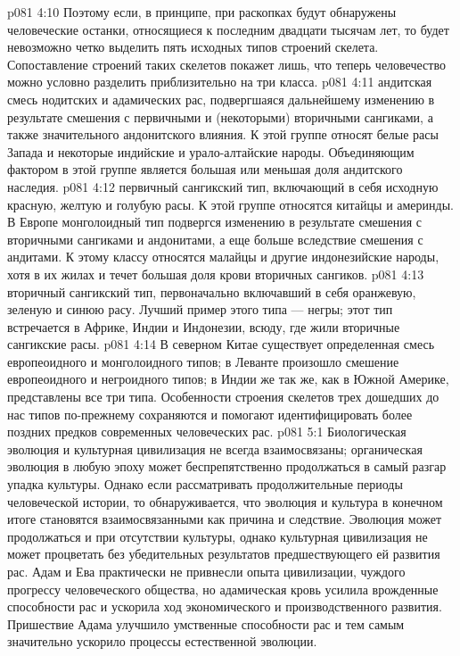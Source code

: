 \vs p081 4:10 Поэтому если, в принципе, при раскопках будут обнаружены человеческие останки, относящиеся к последним двадцати тысячам лет, то будет невозможно четко выделить пять исходных типов строений скелета. Сопоставление строений таких скелетов покажет лишь, что теперь человечество можно условно разделить приблизительно на три класса.
\vs p081 4:11 \bibnobreakspace {} андитская смесь нодитских и адамических рас, подвергшаяся дальнейшему изменению в результате смешения с первичными и (некоторыми) вторичными сангиками, а также значительного андонитского влияния. К этой группе относят белые расы Запада и некоторые индийские и урало\hyp{}алтайские народы. Объединяющим фактором в этой группе является большая или меньшая доля андитского наследия.
\vs p081 4:12 \bibnobreakspace {} первичный сангикский тип, включающий в себя исходную красную, желтую и голубую расы. К этой группе относятся китайцы и америнды. В Европе монголоидный тип подвергся изменению в результате смешения с вторичными сангиками и андонитами, а еще больше вследствие смешения с андитами. К этому классу относятся малайцы и другие индонезийские народы, хотя в их жилах и течет большая доля крови вторичных сангиков.
\vs p081 4:13 \bibnobreakspace {} вторичный сангикский тип, первоначально включавший в себя оранжевую, зеленую и синюю расу. Лучший пример этого типа --- негры; этот тип встречается в Африке, Индии и Индонезии, всюду, где жили вторичные сангикские расы.
\vs p081 4:14 \pc В северном Китае существует определенная смесь европеоидного и монголоидного типов; в Леванте произошло смешение европеоидного и негроидного типов; в Индии же так же, как в Южной Америке, представлены все три типа. Особенности строения скелетов трех дошедших до нас типов по\hyp{}прежнему сохраняются и помогают идентифицировать более поздних предков современных человеческих рас.
\vs p081 5:1 Биологическая эволюция и культурная цивилизация не всегда взаимосвязаны; органическая эволюция в любую эпоху может беспрепятственно продолжаться в самый разгар упадка культуры. Однако если рассматривать продолжительные периоды человеческой истории, то обнаруживается, что эволюция и культура в конечном итоге становятся взаимосвязанными как причина и следствие. Эволюция может продолжаться и при отсутствии культуры, однако культурная цивилизация не может процветать без убедительных результатов предшествующего ей развития рас. Адам и Ева практически не привнесли опыта цивилизации, чуждого прогрессу человеческого общества, но адамическая кровь усилила врожденные способности рас и ускорила ход экономического и производственного развития. Пришествие Адама улучшило умственные способности рас и тем самым значительно ускорило процессы естественной эволюции.
